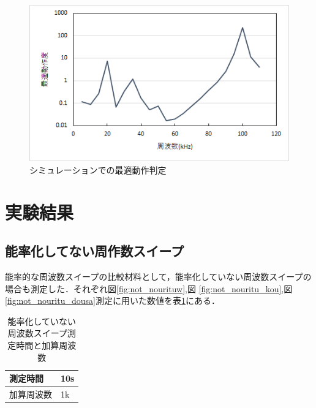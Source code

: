 \documentclass[12pt]{jarticle}
\begin{document}
 \begin{figure}[H]
	\centering
	\includegraphics[scale=1]{saitekidousasimu.png}
	\caption{シミュレーションでの最適動作判定}
	\label{fig:simulatesaiteki}
\end{figure}
\clearpage
\section{実験結果}
\subsection{能率化してない周作数スイープ}
能率的な周波数スイープの比較材料として，能率化していない周波数スイープの場合も測定した．それぞれ図\ref{fig:not_nourituw},図 \ref{fig:not_nouritu_kou},図\ref{fig:not_nouritu_dousa}測定に用いた数値を表\ref{tab:not_nouritu}にある．
\begin{table}[h]
	\centering
	\label{tab:not_nouritu}
	\caption{能率化していない周波数スイープ測定時間と加算周波数}
	\begin{tabular}{|l|l|}
		\hline
		測定時間  & 10s \\ \hline
		加算周波数 & 1k  \\ \hline
	\end{tabular}
\end{table}
\end{document}
